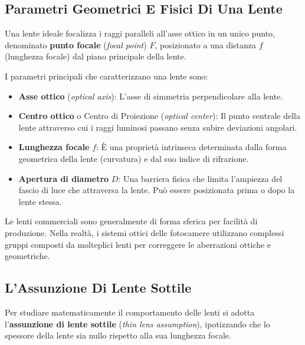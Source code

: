 ﻿\documentclass[11pt, a4paper]{article}
\begin{document}
\subsection{Parametri Geometrici E Fisici Di Una Lente}

Una lente ideale focalizza i raggi paralleli all'asse ottico in un unico punto, denominato \textbf{punto focale} (\emph{focal point}) $F$, posizionato a una distanza $f$ (lunghezza focale) dal piano principale della lente.


I parametri principali che caratterizzano una lente sono:
\begin{itemize}[noitemsep]
    \item \textbf{Asse ottico} (\emph{optical axis}): L'asse di simmetria perpendicolare alla lente.
    \item \textbf{Centro ottico} o Centro di Proiezione (\emph{optical center}): Il punto centrale della lente attraverso cui i raggi luminosi passano senza subire deviazioni angolari.
    \item \textbf{Lunghezza focale} $f$: È una proprietà intrinseca determinata dalla forma geometrica della lente (curvatura) e dal suo indice di rifrazione.
    \item \textbf{Apertura di diametro} $D$: Una barriera fisica che limita l'ampiezza del fascio di luce che attraversa la lente. Può essere posizionata prima o dopo la lente stessa.
\end{itemize}

Le lenti commerciali sono generalmente di forma sferica per facilità di produzione. Nella realtà, i sistemi ottici delle fotocamere utilizzano complessi gruppi composti da molteplici lenti per correggere le aberrazioni ottiche e geometriche.



\subsection{L'Assunzione Di Lente Sottile}

Per studiare matematicamente il comportamento delle lenti si adotta l'\textbf{assunzione di lente sottile} (\emph{thin lens assumption}), ipotizzando che lo spessore della lente sia nullo rispetto alla sua lunghezza focale.
\end{document}
